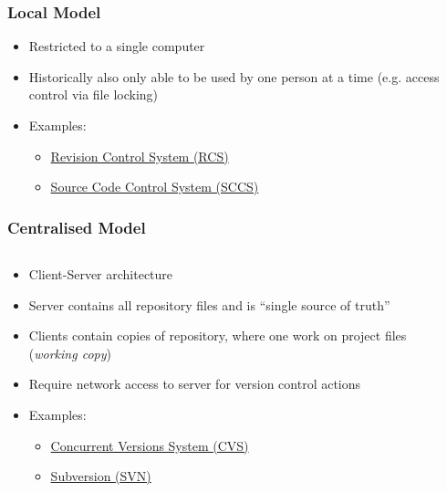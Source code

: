 \documentclass{git_course}
\begin{document}
\begin{frame}
\frametitle{Local Model}
\begin{itemize}
    \item Restricted to a single computer
    \item Historically also only able to be used by one person at a time
        (e.g. access control via file locking)
    \item Examples:
        \begin{itemize}
            \item \href{https://en.wikipedia.org/wiki/Revision_Control_System}
                       {Revision Control System (RCS)}
            \item \href{https://en.wikipedia.org/wiki/Source_Code_Control_System}
                       {Source Code Control System (SCCS)}
        \end{itemize}
\end{itemize}
\end{frame}

\begin{frame}[fragile]
\frametitle{Centralised Model}
\begin{columns}[T]
    \begin{column}{0.7\textwidth}
        \begin{itemize}
            \item Client-Server architecture
            \item Server contains all repository files and is ``single source of truth''
            \item Clients contain copies of repository, where one work on project
                files (\emph{working copy})
            \item Require network access to server for version control actions
            \item Examples:
            \begin{itemize}
                \item \href{https://en.wikipedia.org/wiki/Concurrent_Versions_System}
                           {Concurrent Versions System (CVS)}
                \item \href{https://en.wikipedia.org/wiki/Apache_Subversion}
                           {Subversion (SVN)}
            \end{itemize}
        \end{itemize}
    \end{column}
    \begin{column}{0.4\textwidth}
        \begin{center}
        \resizebox{\textwidth}{!}{}
        \end{center}
    \end{column}
\end{columns}
\end{frame}
\end{document}
